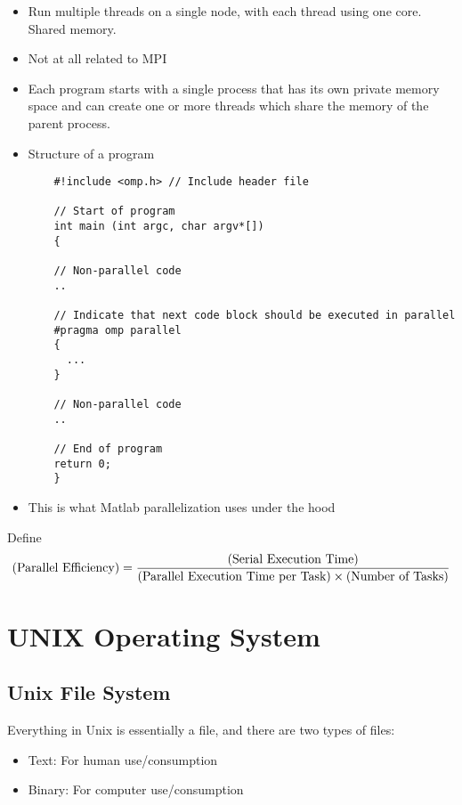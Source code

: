 \documentclass[12pt]{article}
\theoremstyle{plain}
\theoremstyle{definition}
\theoremstyle{remark}
\begin{document}
\begin{itemize}
  \item Run multiple threads on a single node, with each thread using
    one core. Shared memory.
  \item Not at all related to MPI
  \item Each program starts with a single process that has its own
    private memory space and can create one or more threads which share
    the memory of the parent process.
  \item Structure of a program
    \begin{lstlisting}
    #!include <omp.h> // Include header file

    // Start of program
    int main (int argc, char argv*[])
    {

    // Non-parallel code
    ..

    // Indicate that next code block should be executed in parallel
    #pragma omp parallel
    {
      ...
    }

    // Non-parallel code
    ..

    // End of program
    return 0;
    }

    \end{lstlisting}

  \item This is what Matlab parallelization uses under the hood
\end{itemize}
Define
\begin{align*}
  \text{(Parallel Efficiency)}
  =
  \frac{%
    \text{(Serial Execution Time)}
  }{%
    \text{(Parallel Execution Time per Task)}
    \times
    \text{(Number of Tasks)}
  }
\end{align*}





\clearpage
\section{UNIX Operating System}

\subsection{Unix File System}

Everything in Unix is essentially a file, and there are two types of
files:
\begin{itemize}
  \item Text: For human use/consumption
  \item Binary: For computer use/consumption
\end{itemize}
\end{document}
